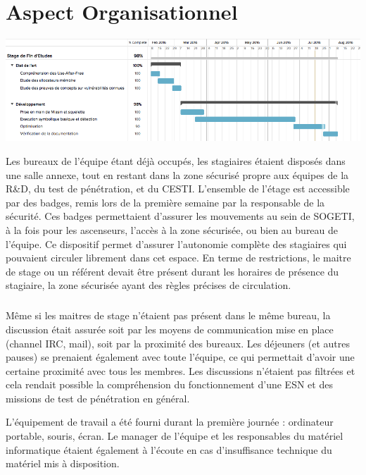 \section*{Aspect Organisationnel}
\begin{center}
\includegraphics[scale=0.5]{gant.png}\newline
\end{center}

Les bureaux de l'équipe étant déjà occupés, les stagiaires étaient disposés dans une salle annexe, tout en restant dans la zone sécurisé propre aux équipes de
la R\&D, du test de pénétration, et du CESTI. L'ensemble de l'étage est accessible par des badges, remis lors de la première semaine par la responsable de la
sécurité. Ces badges permettaient d'assurer les mouvements au sein de SOGETI, à la fois pour les ascenseurs, l'accès à la zone sécurisée, ou bien au bureau
de l'équipe. Ce dispositif permet d'assurer l'autonomie complète des stagiaires qui pouvaient circuler librement dans cet espace. En terme de restrictions,
le maitre de stage ou un référent devait être présent durant les horaires de présence du stagiaire, la zone sécurisée ayant des règles précises de circulation.

\subparagraph{}
Même si les maitres de stage n'étaient pas présent dans le même bureau, la discussion était assurée soit par les moyens de communication mise en
place (channel IRC, mail), soit par la proximité des bureaux. Les déjeuners (et autres pauses) se prenaient également avec toute l'équipe, ce qui permettait
d'avoir une certaine proximité avec tous les membres. Les discussions n'étaient pas filtrées et cela rendait possible la compréhension du fonctionnement d'une
ESN et des missions de test de pénétration en général.

L'équipement de travail a été fourni durant la première journée : ordinateur portable, souris, écran. Le manager de l'équipe et les responsables du matériel
informatique étaient également à l'écoute en cas d'insuffisance technique du matériel mis à disposition.


